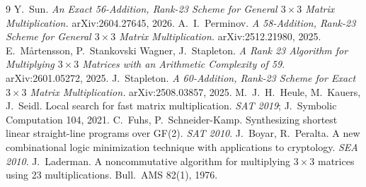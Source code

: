 \documentclass[conference]{IEEEtran}
\begin{document}
\begin{thebibliography}{9}
 Y.~Sun. \emph{An Exact 56-Addition, Rank-23 Scheme
for General $3\times3$ Matrix Multiplication.} arXiv:2604.27645, 2026.
 A.~I.~Perminov. \emph{A 58-Addition, Rank-23
Scheme for General $3\times3$ Matrix Multiplication.}
arXiv:2512.21980, 2025.
 E.~M\aa rtensson, P.~Stankovski Wagner, J.~Stapleton.
\emph{A Rank 23 Algorithm for Multiplying $3\times3$ Matrices with an
Arithmetic Complexity of 59.} arXiv:2601.05272, 2025.
 J.~Stapleton. \emph{A 60-Addition, Rank-23
Scheme for Exact $3\times3$ Matrix Multiplication.} arXiv:2508.03857,
2025.
 M.~J.~H.~Heule, M.~Kauers, J.~Seidl. Local search for
fast matrix multiplication. \emph{SAT 2019}; J.~Symbolic
Computation 104, 2021.
 C.~Fuhs, P.~Schneider-Kamp. Synthesizing shortest
linear straight-line programs over GF(2). \emph{SAT 2010}.
 J.~Boyar, R.~Peralta. A new combinational logic
minimization technique with applications to cryptology.
\emph{SEA 2010}.
 J.~Laderman. A noncommutative algorithm for
multiplying $3\times 3$ matrices using 23 multiplications.
Bull.~AMS 82(1), 1976.
\end{thebibliography}
\end{document}
